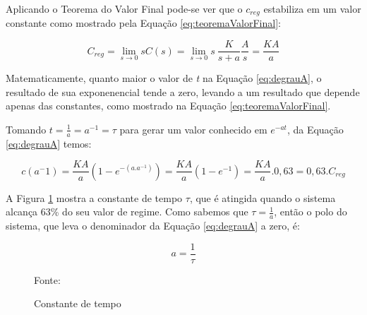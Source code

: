 
Aplicando o Teorema do Valor Final pode-se ver que o \emph{$c_{reg}$} estabiliza em um valor constante como mostrado pela Equação \ref{eq:teoremaValorFinal}:

\begin{equation}
C_{reg} = \lim_{s \rightarrow 0} sC(s) = \lim_{s \rightarrow 0} s\ \frac{K}{s+a}\frac{A}{s} = \frac{KA}{a}
\label{eq:teoremaValorFinal}
\end{equation}

Matematicamente, quanto maior o valor de \emph{t} na Equação \ref{eq:degrauA}, o resultado de sua exponenencial tende a zero, levando a um resultado que depende apenas das constantes, como mostrado na Equação \ref{eq:teoremaValorFinal}. 

Tomando $t= \frac{1}{a} = a^{-1} = \tau$ para gerar um valor conhecido em $e^{-at}$, da Equação \ref{eq:degrauA} temos:


\begin{equation}
c(a^-1) = \frac{KA}{a}(1-e^{-(a.a^{-1})}) = \frac{KA}{a}(1-e^{-1}) = \frac{KA}{a}.0,63 = 0,63 . C_{reg}
\end{equation}

A Figura \ref{fig:constTempo} mostra a constante de tempo $\tau$, que é atingida quando o sistema alcança 63\% do seu valor de regime. Como sabemos que $\tau = \frac{1}{a}$, então o polo do sistema, que leva o denominador da Equação \ref{eq:degrauA} a zero, é:

\begin{equation}
a = \frac{1}{\tau}
\end{equation}



\begin{figure}
\centering
\caption{Constante de tempo}
\label{fig:constTempo}

{\small Fonte: \cite{Ogata}}
\end{figure}

